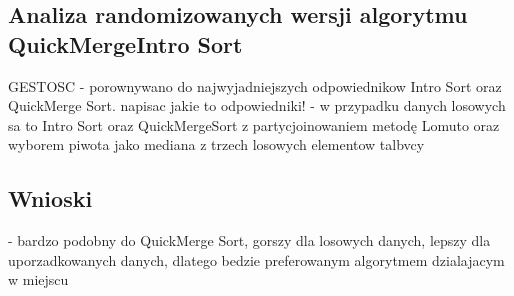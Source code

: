 \begin{figure}[]
	\centering
	
	\caption[]{}
	\label{fig:quick-merge-intro-sort-deterministic-pivot-density-sorted}
\end{figure}

\subsection{Analiza randomizowanych wersji algorytmu QuickMergeIntro Sort}

GESTOSC
- porownywano do najwyjadniejszych odpowiednikow Intro Sort oraz QuickMerge Sort. napisac jakie to odpowiedniki!
- w przypadku danych losowych sa to Intro Sort oraz QuickMergeSort z partycjoinowaniem metodę Lomuto oraz wyborem piwota jako mediana z trzech losowych elementow talbvcy 

\begin{figure}[]
	\centering
	
	\caption[]{}
	\label{fig:quick-merge-intro-sort-nondeterministic-pivot-random-sorted}
\end{figure}

\begin{figure}[]
	\centering
	
	\caption[]{}
	\label{fig:quick-merge-intro-sort-nondeterministic-pivot-density}
\end{figure}

\begin{figure}[]
	\centering
	
	\caption[]{}
	\label{fig:quick-merge-intro-sort-nondeterministic-pivot-density-sorted}
\end{figure}

\subsection{Wnioski}
- bardzo podobny do QuickMerge Sort, gorszy dla losowych danych, lepszy dla uporzadkowanych danych, dlatego bedzie preferowanym algorytmem dzialajacym w miejscu